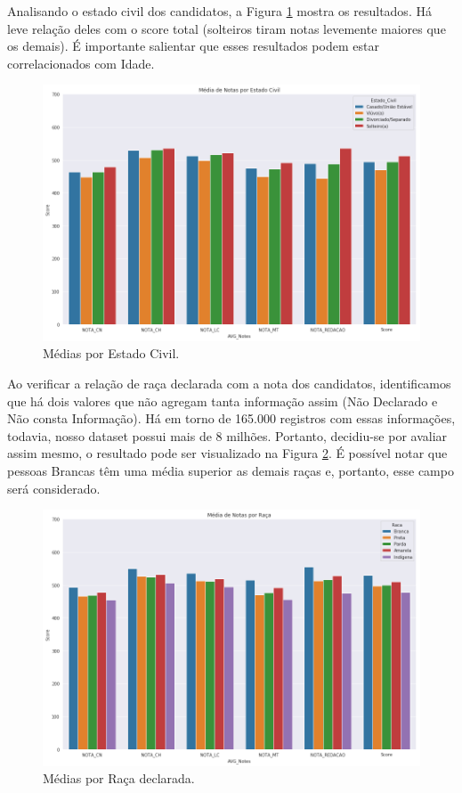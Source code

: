 \documentclass{article}
\begin{document}
Analisando o estado civil dos candidatos, a Figura \ref{fig:mean_by_civil} mostra os resultados. Há leve relação deles com o score total (solteiros tiram notas levemente maiores que os demais). É importante salientar que esses resultados podem estar correlacionados com Idade.

\begin{figure}[H]
\centering
  \includegraphics[width=0.8 \linewidth]{img/mean_by_civil.png}
  \caption{Médias por Estado Civil.}
  \label{fig:mean_by_civil}
\end{figure}

Ao verificar a relação de raça declarada com a nota dos candidatos, identificamos que há dois valores que não agregam tanta informação assim (Não Declarado e Não consta Informação). Há em torno de 165.000 registros com essas informações, todavia, nosso dataset possui mais de 8 milhões. Portanto, decidiu-se por avaliar assim mesmo, o resultado pode ser visualizado na Figura \ref{fig:mean_by_raca}. É possível notar que pessoas Brancas têm uma média superior as demais raças e, portanto, esse campo será considerado.

\begin{figure}[H]
\centering
  \includegraphics[width=0.8 \linewidth]{img/mean_by_raca.png}
  \caption{Médias por Raça declarada.}
  \label{fig:mean_by_raca}
\end{figure}
\end{document}
